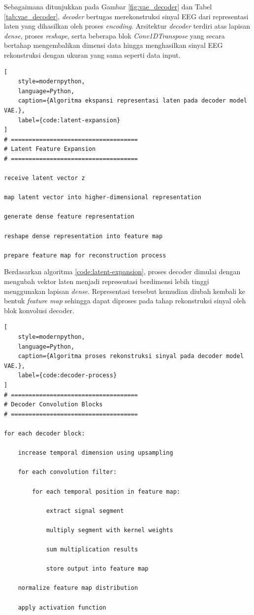 Sebagaimana ditunjukkan pada Gambar \ref{fig:vae_decoder} dan Tabel \ref{tab:vae_decoder}, \textit{decoder} bertugas merekonstruksi sinyal EEG dari representasi laten yang dihasilkan oleh proses \textit{encoding}. Arsitektur \textit{decoder} terdiri atas lapisan \textit{dense}, proses \textit{reshape}, serta beberapa blok \textit{Conv1DTranspose} yang secara bertahap mengembalikan dimensi data hingga menghasilkan sinyal EEG rekonstruksi dengan ukuran yang sama seperti data input.
\begin{lstlisting}[
    style=modernpython,
    language=Python,
    caption={Algoritma ekspansi representasi laten pada decoder model VAE.},
    label={code:latent-expansion}
]
# ====================================
# Latent Feature Expansion
# ====================================

receive latent vector z

map latent vector into higher-dimensional representation

generate dense feature representation

reshape dense representation into feature map

prepare feature map for reconstruction process
\end{lstlisting}

Berdasarkan algoritma \ref{code:latent-expansion}, proses decoder dimulai dengan mengubah vektor laten menjadi representasi berdimensi lebih tinggi menggunakan lapisan \textit{dense}. Representasi tersebut kemudian diubah kembali ke bentuk \textit{feature map} sehingga dapat diproses pada tahap rekonstruksi sinyal oleh blok konvolusi decoder.


\begin{lstlisting}[
    style=modernpython,
    language=Python,
    caption={Algoritma proses rekonstruksi sinyal pada decoder model VAE.},
    label={code:decoder-process}
]
# ====================================
# Decoder Convolution Blocks
# ====================================

for each decoder block:

    increase temporal dimension using upsampling

    for each convolution filter:

        for each temporal position in feature map:

            extract signal segment

            multiply segment with kernel weights

            sum multiplication results

            store output into feature map

    normalize feature map distribution

    apply activation function


\end{lstlisting}

